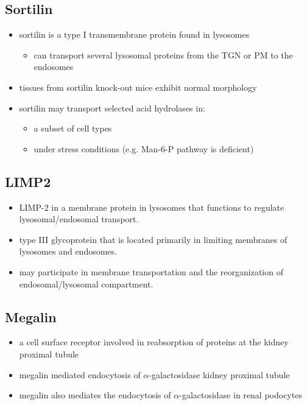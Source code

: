 \documentclass{scrartcl}
\begin{document}
\subsection{Sortilin}
\label{sec:org8b598aa}
\begin{itemize}
\item sortilin is a type I transmembrane protein found in lysosomes
\begin{itemize}
\item can transport several lysosomal proteins from the TGN or PM to the endosomes
\end{itemize}
\item tissues from sortilin knock-out mice exhibit normal morphology
\item sortilin may transport selected acid hydrolases in:
\begin{itemize}
\item a subset of cell types
\item under stress conditions (e.g. Man-6-P pathway is deficient)
\end{itemize}
\end{itemize}

\subsection{LIMP2}
\label{sec:orga89b945}
\begin{itemize}
\item LIMP-2 in a membrane protein in lysosomes that functions to regulate lysosomal/endosomal transport.
\item type III glycoprotein that is located primarily in limiting membranes of lysosomes and endosomes.
\item may participate in membrane transportation and the reorganization of endosomal/lysosomal compartment.
\end{itemize}

\subsection{Megalin}
\label{sec:org7e63317}
\begin{itemize}
\item a cell surface receptor involved in reabsorption of proteins at the kidney proximal tubule
\item megalin mediated endocytosis of \(\alpha\)-galactosidase kidney proximal tubule
\item megalin also mediates the endocytosis of \(\alpha\)-galactosidase in renal podocytes
\end{itemize}
\end{document}
